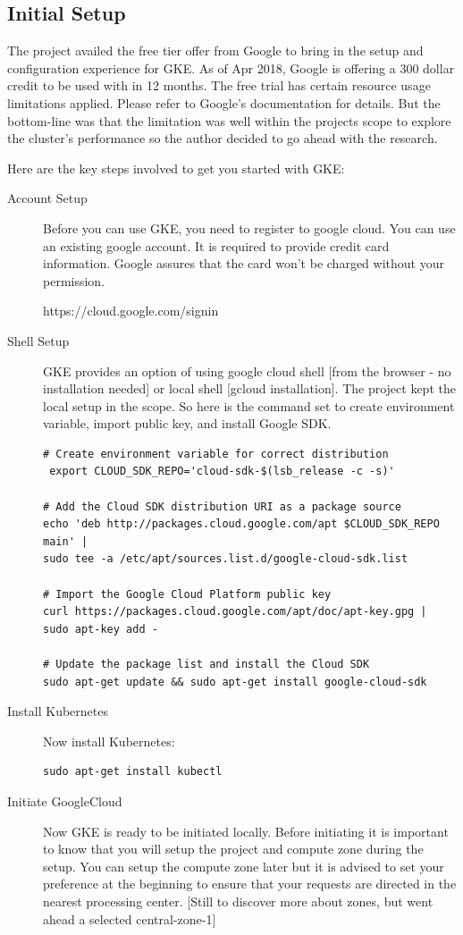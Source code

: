 \subsection{Initial Setup}
The project availed the free tier offer from Google to bring in the setup and 
configuration experience for GKE. As of Apr 2018, Google is offering a 300 
dollar credit to be used with in 12 months. The free trial has certain resource
usage limitations applied. Please refer to Google's documentation for details.
 But the bottom-line was that the limitation was well within the projects scope
  to explore the cluster's performance so the author decided to go ahead with 
  the research. 

Here are the key steps involved to get you started with GKE:
\begin{description}
\item[Account Setup] Before you can use GKE, you need to register to google
 cloud. You can use an existing google account. It is required to provide 
 credit card information. 
Google assures that the card won't be charged without your permission.

https://cloud.google.com/signin

\item[Shell Setup] GKE provides an option of using google cloud shell [from the
 browser - no installation needed] 
or local shell [gcloud installation]. The project kept the local setup in the 
scope. So here is the command set to create environment variable, import
public key, and install Google SDK.

\begin{verbatim}
# Create environment variable for correct distribution
 export CLOUD_SDK_REPO='cloud-sdk-$(lsb_release -c -s)'

# Add the Cloud SDK distribution URI as a package source
echo 'deb http://packages.cloud.google.com/apt $CLOUD_SDK_REPO main' | 
sudo tee -a /etc/apt/sources.list.d/google-cloud-sdk.list

# Import the Google Cloud Platform public key
curl https://packages.cloud.google.com/apt/doc/apt-key.gpg | sudo apt-key add -

# Update the package list and install the Cloud SDK
sudo apt-get update && sudo apt-get install google-cloud-sdk
\end{verbatim}
\item[Install Kubernetes] Now install Kubernetes:
\begin{verbatim}
sudo apt-get install kubectl
\end{verbatim}
\item[Initiate GoogleCloud] Now GKE is ready to be initiated locally. Before 
initiating it is 
important to know that you will setup the project and compute zone during the 
setup. You can setup the compute zone later but it is advised to set your 
preference at the beginning to ensure that your requests are directed in the 
nearest processing center. [Still to discover more about zones, but went ahead 
a selected central-zone-1] 


\end{description}
